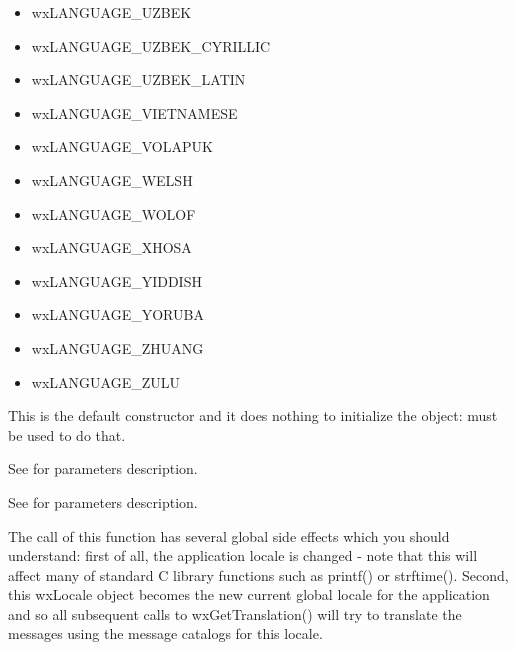\begin{itemize}
\item wxLANGUAGE\_UZBEK
\item wxLANGUAGE\_UZBEK\_CYRILLIC
\item wxLANGUAGE\_UZBEK\_LATIN
\item wxLANGUAGE\_VIETNAMESE
\item wxLANGUAGE\_VOLAPUK
\item wxLANGUAGE\_WELSH
\item wxLANGUAGE\_WOLOF
\item wxLANGUAGE\_XHOSA
\item wxLANGUAGE\_YIDDISH
\item wxLANGUAGE\_YORUBA
\item wxLANGUAGE\_ZHUANG
\item wxLANGUAGE\_ZULU
\end{itemize}





\label{wxlocaledefctor}


This is the default constructor and it does nothing to initialize the object: 
 must be used to do that.


See  for parameters description.


See  for parameters description.

The call of this function has several global side effects which you should
understand: first of all, the application locale is changed - note that this
will affect many of standard C library functions such as printf() or strftime().
Second, this wxLocale object becomes the new current global locale for the
application and so all subsequent calls to wxGetTranslation() will try to
translate the messages using the message catalogs for this locale.


\label{wxlocaledtor}


